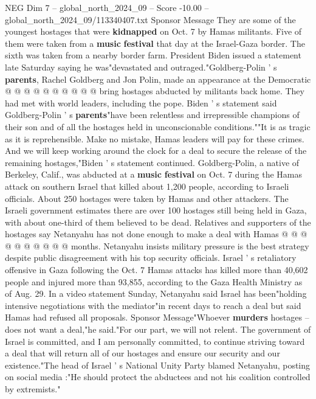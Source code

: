 \begin{textsample}{NEG Dim 7 – global\_north\_2024\_09 – Score -10.00 – global\_north\_2024\_09/113340407.txt}
Sponsor Message They are some of the youngest hostages that were \textbf{kidnapped} on Oct. 7 by Hamas militants.
Five of them were taken from a \textbf{music} \textbf{festival} that day at the Israel-Gaza border.
The sixth was taken from a nearby border farm.
President Biden issued a statement late Saturday saying he was"devastated and outraged."Goldberg-Polin ' s \textbf{parents}, Rachel Goldberg and Jon Polin, made an appearance at the Democratic @ @ @ @ @ @ @ @ @ @ bring hostages abducted by militants back home.
They had met with world leaders, including the pope.
Biden ' s statement said Goldberg-Polin ' s \textbf{parents}"have been relentless and irrepressible champions of their son and of all the hostages held in unconscionable conditions.""It is as tragic as it is reprehensible.
Make no mistake, Hamas leaders will pay for these crimes.
And we will keep working around the clock for a deal to secure the release of the remaining hostages,"Biden ' s statement continued.
Goldberg-Polin, a native of Berkeley, Calif., was abducted at a \textbf{music} \textbf{festival} on Oct. 7 during the Hamas attack on southern Israel that killed about 1,200 people, according to Israeli officials.
About 250 hostages were taken by Hamas and other attackers.
The Israeli government estimates there are over 100 hostages still being held in Gaza, with about one-third of them believed to be dead.
Relatives and supporters of the hostages say Netanyahu has not done enough to make a deal with Hamas @ @ @ @ @ @ @ @ @ @ months.
Netanyahu insists military pressure is the best strategy despite public disagreement with his top security officials.
Israel ' s retaliatory offensive in Gaza following the Oct. 7 Hamas attacks has killed more than 40,602 people and injured more than 93,855, according to the Gaza Health Ministry as of Aug. 29.
In a video statement Sunday, Netanyahu said Israel has been"holding intensive negotiations with the mediator"in recent days to reach a deal but said Hamas had refused all proposals.
Sponsor Message"Whoever \textbf{murders} hostages -- does not want a deal,"he said."For our part, we will not relent.
The government of Israel is committed, and I am personally committed, to continue striving toward a deal that will return all of our hostages and ensure our security and our existence."The head of Israel ' s National Unity Party blamed Netanyahu, posting on social media :"He should protect the abductees and not his coalition controlled by extremists."

\end{textsample}
